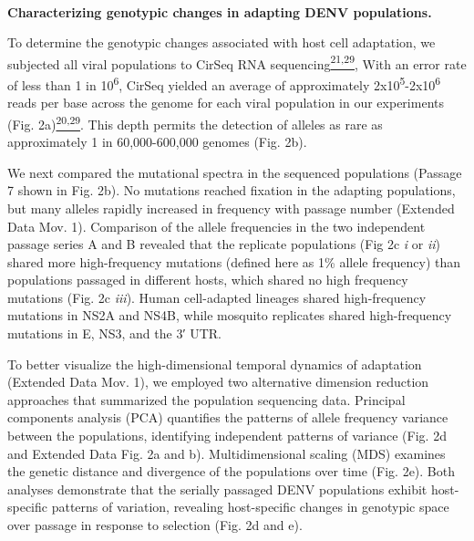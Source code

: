 \documentclass[
]{article}
\begin{document}
\textbf{~}

\textbf{Characterizing genotypic changes in adapting DENV populations.}

To determine the genotypic changes associated with host cell adaptation,
we subjected all viral populations to CirSeq RNA
sequencing\href{https://paperpile.com/c/REZjPf/CObqp+jDAqh}{\textsuperscript{21,29}},
With an error rate of less than 1 in 10\textsuperscript{6}, CirSeq
yielded an average of approximately
2x10\textsuperscript{5}-2x10\textsuperscript{6} reads per base across
the genome for each viral population in our experiments (Fig.
2a)\href{https://paperpile.com/c/REZjPf/bczFl+jDAqh}{\textsuperscript{20,29}}.
This depth permits the detection of alleles as rare as approximately 1
in 60,000-600,000 genomes (Fig. 2b).~ ~ ~~~

We next compared the mutational spectra in the sequenced populations
(Passage 7 shown in Fig. 2b). No mutations reached fixation in the
adapting populations, but many alleles rapidly increased in frequency
with passage number (Extended Data Mov. 1). Comparison of the allele
frequencies in the two independent passage series A and B revealed that
the replicate populations (Fig 2c \emph{i} or \emph{ii}) shared more
high-frequency mutations (defined here as 1\% allele frequency) than
populations passaged in different hosts, which shared no high frequency
mutations (Fig. 2c \emph{iii}). Human cell-adapted lineages shared
high-frequency mutations in NS2A and NS4B, while mosquito replicates
shared high-frequency mutations in E, NS3, and the 3′ UTR.

To better visualize the high-dimensional temporal dynamics of adaptation
(Extended Data Mov. 1), we employed two alternative dimension reduction
approaches that summarized the population sequencing data. Principal
components analysis (PCA) quantifies the patterns of allele frequency
variance between the populations, identifying independent patterns of
variance (Fig. 2d and Extended Data Fig. 2a and b). Multidimensional
scaling (MDS) examines the genetic distance and divergence of the
populations over time (Fig. 2e). Both analyses demonstrate that the
serially passaged DENV populations exhibit host-specific patterns of
variation, revealing host-specific changes in genotypic space over
passage in response to selection (Fig. 2d and e).
\end{document}

